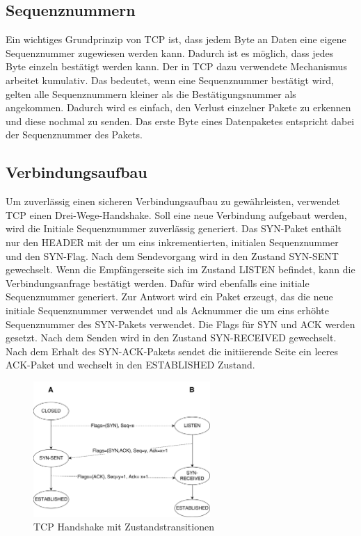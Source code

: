 \subsection{Sequenznummern}
Ein wichtiges Grundprinzip von TCP ist, dass jedem Byte an Daten eine eigene Sequenznummer zugewiesen werden kann. Dadurch ist es möglich, dass jedes Byte einzeln bestätigt werden kann. Der in TCP dazu verwendete Mechanismus arbeitet kumulativ. Das bedeutet, wenn eine Sequenznummer bestätigt wird, gelten alle Sequenznummern kleiner als die Bestätigungsnummer als angekommen. Dadurch wird es einfach, den Verlust einzelner Pakete zu erkennen und diese nochmal zu senden. Das erste Byte eines Datenpaketes entspricht dabei der Sequenznummer des Pakets. \cite{TCPr} 

\subsection{Verbindungsaufbau}
Um zuverlässig einen sicheren Verbindungsaufbau zu gewährleisten, verwendet TCP einen Drei-Wege-Handshake. Soll eine neue Verbindung aufgebaut werden, wird die Initiale Sequenznummer zuverlässig generiert. Das SYN-Paket enthält nur den HEADER mit der um eins inkrementierten, initialen Sequenznummer und den SYN-Flag. Nach dem Sendevorgang wird in den Zustand SYN-SENT gewechselt. Wenn die Empfängerseite sich im Zustand LISTEN befindet, kann die Verbindungsanfrage bestätigt werden. Dafür wird ebenfalls eine initiale Sequenznummer generiert. Zur Antwort wird ein Paket erzeugt, das die neue initiale Sequenznummer verwendet und als Acknummer die um eins erhöhte Sequenznummer des SYN-Pakets verwendet. Die Flags für SYN und ACK werden gesetzt. Nach dem Senden wird in den Zustand SYN-RECEIVED gewechselt.\\
Nach dem Erhalt des SYN-ACK-Pakets sendet die initiierende Seite ein leeres ACK-Paket und wechselt in den ESTABLISHED Zustand. \cite{TCPr} 

\begin{figure}[h]
	\centering
	\includegraphics[width=0.6\textwidth]{Graphics/tcp_Handshake.png}
	\caption{TCP Handshake mit Zustandstransitionen}
\end{figure}
\FloatBarrier
